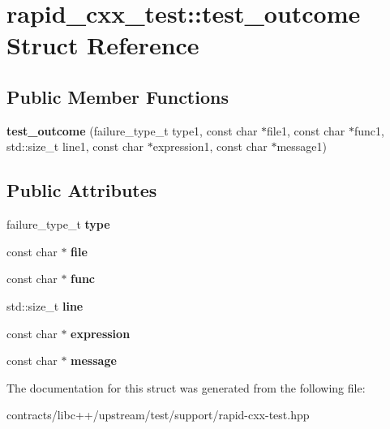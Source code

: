 \hypertarget{structrapid__cxx__test_1_1test__outcome}{}\section{rapid\+\_\+cxx\+\_\+test\+:\+:test\+\_\+outcome Struct Reference}
\label{structrapid__cxx__test_1_1test__outcome}
\subsection*{Public Member Functions}
\begin{DoxyCompactItemize}
\item 
\mbox{\label{structrapid__cxx__test_1_1test__outcome_a1f644858fe68b24053129acbbc2d966e}} 
{\bfseries test\+\_\+outcome} (failure\+\_\+type\+\_\+t type1, const char $\ast$file1, const char $\ast$func1, std\+::size\+\_\+t line1, const char $\ast$expression1, const char $\ast$message1)
\end{DoxyCompactItemize}
\subsection*{Public Attributes}
\begin{DoxyCompactItemize}
\item 
\mbox{\label{structrapid__cxx__test_1_1test__outcome_a4df3fca7c481f864f7e650280a6f1b35}} 
failure\+\_\+type\+\_\+t {\bfseries type}
\item 
\mbox{\label{structrapid__cxx__test_1_1test__outcome_a63ae9443903d67161c72b70aab62dae5}} 
const char $\ast$ {\bfseries file}
\item 
\mbox{\label{structrapid__cxx__test_1_1test__outcome_a6255400331d12abaa31b37fdb4a1ffa7}} 
const char $\ast$ {\bfseries func}
\item 
\mbox{\label{structrapid__cxx__test_1_1test__outcome_a33bec3a79f7dd385e901a837b99ee207}} 
std\+::size\+\_\+t {\bfseries line}
\item 
\mbox{\label{structrapid__cxx__test_1_1test__outcome_a110dc9abaaaea5ea41295fad4ccfb94b}} 
const char $\ast$ {\bfseries expression}
\item 
\mbox{\label{structrapid__cxx__test_1_1test__outcome_aeaaf39947460bb7bcdd09fc0926fe63f}} 
const char $\ast$ {\bfseries message}
\end{DoxyCompactItemize}


The documentation for this struct was generated from the following file\+:\begin{DoxyCompactItemize}
\item 
contracts/libc++/upstream/test/support/rapid-\/cxx-\/test.\+hpp\end{DoxyCompactItemize}

